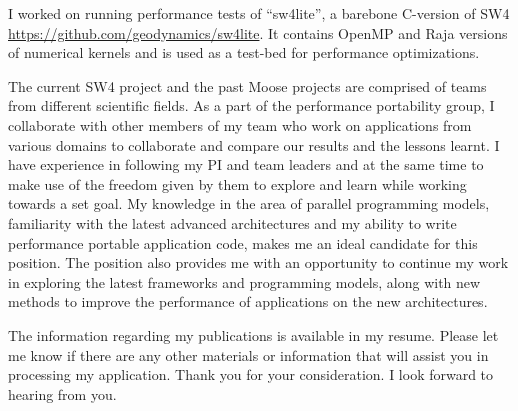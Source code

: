 \documentclass[10pt,stdletter,dateno]{newlfm}
\begin{document}
\begin{newlfm}
    I worked on running performance tests of \enquote{sw4lite}, a barebone C-version of SW4
    \url{https://github.com/geodynamics/sw4lite}.
    It contains OpenMP and Raja versions of numerical kernels and is used as a test-bed for performance optimizations.\\
%
    \par
    The current SW4 project and the past Moose projects are comprised of teams from different scientific fields.
    As a part of the performance portability group, I collaborate with other members of my team who work on applications from various domains to collaborate and compare our results and the lessons learnt.
    I have experience in following my PI and team leaders and at the same time to make use of the freedom given by them to explore and learn while working towards a set goal.
    My knowledge in the area of parallel programming models, familiarity with the latest advanced architectures and my ability to write performance portable application code, makes me an ideal candidate for this position.
    The position also provides me with an opportunity to continue my work in exploring the latest frameworks and programming models, along with new methods to improve the performance of applications on the new architectures.
%
	   \par
	   The information regarding my publications is available in my resume.
	   Please let me know if there are any other materials or information that will assist you in processing my application.
	   Thank you for your consideration. I look forward to hearing from you.
%
\end{newlfm}
\end{document}
